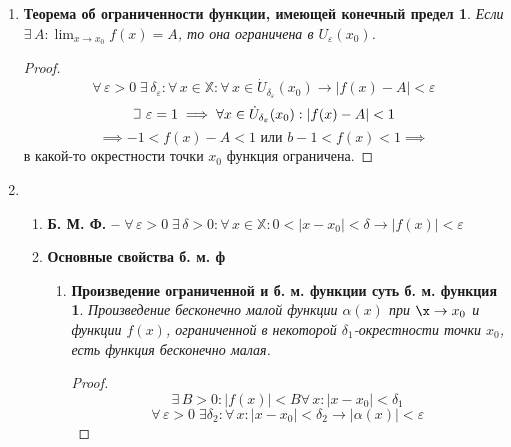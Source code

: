 \documentclass{article}
\theoremstyle{plain}
\def\letus{%
    \mathord{\setbox0=\hbox{$\exists$}%
             \hbox{\kern 0.125\wd0%
                   \vbox to \ht0{%
                      \hrule width 0.75\wd0%
                      \vfill%
                      \hrule width 0.75\wd0}%
                   \vrule height \ht0%
                   \kern 0.125\wd0}%
           }%
}
\begin{document}
\begin{enumerate}
\begin{enumerate}
\begin{proof}
                     $$\delta = \min{{\delta_{\varepsilon_1}, \delta_{\varepsilon_2}}}\;: \forall\, x \in \mathbb{X}\rightarrow 0 < |x - a| < \delta.$$
                     $$|\xi - \psi| \le |f(x) - \xi| + |f(x) - \psi| \le 2\varepsilon \implies$$
                     По \textbf{упрощай-лемме}: $|\xi - \psi| < \varepsilon,\; \varepsilon > 0 \implies \xi = \psi$.
            \end{proof}
        \end{enumerate}
        \item \newtheorem*{ogran*}{Теорема об ограниченности функции, имеющей конечный предел}
        \begin{ogran*}
        Если $\exists\, A: \lim_{x \to x_0}{f(x)} = A$, то она ограничена в $U_{\varepsilon}(x_0)$.
        \end{ogran*}
        \begin{proof}
               $$ \forall\, \varepsilon > 0\; \exists\, \delta_{\varepsilon}: \forall\, x \in \mathbb{X}: \forall\, x \in \dot{U}_{\delta_\varepsilon}(x_0) \rightarrow |f(x) - A| < \varepsilon$$
               $$\letus \,\, \varepsilon = 1\implies \forall x \in \dot{U}_{\delta_\varepsilon}(x_0): |f(x) - A| < 1$$
               $$\implies -1 < f(x) - A < 1 \text{ или } b - 1 < f(x) < 1\implies$$
               в какой-то окрестности точки $x_0$ функция ограничена.
        \end{proof}
        \item \begin{enumerate}
            \item \textbf{Б. М. Ф. -- } $\forall\,\varepsilon > 0 \; \exists\, \delta > 0: \forall\, x \in \mathbb{X}: 0 < |x - x_0| < \delta \rightarrow |f(x)| < \varepsilon$
            \item \textbf{Основные свойства б. м. ф}
            \begin{enumerate}
                \item \newtheorem*{prop1*}{Произведение ограниченной и б. м. функции суть б. м. функция}
                \begin{prop1*}
                Произведение бесконечно малой функции $\alpha(x)$ при $\x \to x_0$ и функции $f(x)$, ограниченной в некоторой $\delta_1$-окрестности точки $x_0$, есть функция бесконечно малая.
                \end{prop1*}
                \begin{proof}
                            $$\exists \, B > 0: |f(x)| < B \forall\, x: |x - x_0| < \delta_1$$
                            $$\forall\,\varepsilon > 0\;\exists \delta_2: \forall\, x: |x - x_0| < \delta_2 \rightarrow |\alpha(x)| < \varepsilon$$

\end{proof}
\end{enumerate}
\end{enumerate}
\end{enumerate}
\end{document}
